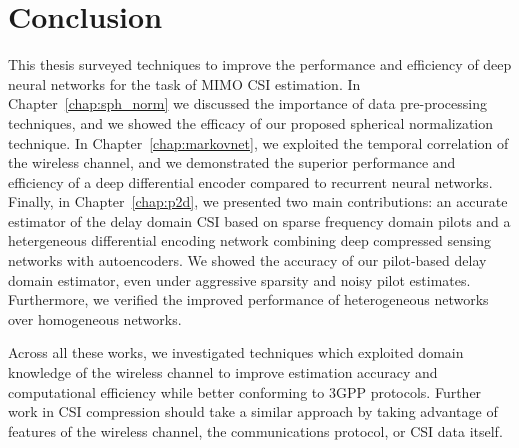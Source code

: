 \chapter{Conclusion} \label{chap:conclusion}

This thesis surveyed techniques to improve the performance and efficiency of deep neural networks for the task of MIMO CSI estimation. In Chapter~\ref{chap:sph_norm} we discussed the importance of data pre-processing techniques, and we showed the efficacy of our proposed spherical normalization technique. In Chapter~\ref{chap:markovnet}, we exploited the temporal correlation of the wireless channel, and we demonstrated the superior performance and efficiency of a deep differential encoder compared to recurrent neural networks. Finally, in Chapter~\ref{chap:p2d}, we presented two main contributions: an accurate estimator of the delay domain CSI based on sparse frequency domain pilots and a hetergeneous differential encoding network combining deep compressed sensing networks with autoencoders. We showed the accuracy of our pilot-based delay domain estimator, even under aggressive sparsity and noisy pilot estimates. Furthermore, we verified the improved performance of heterogeneous networks over homogeneous networks.

Across all these works, we investigated techniques which exploited domain knowledge of the wireless channel to improve estimation accuracy and computational efficiency while better conforming to 3GPP protocols. Further work in CSI compression should take a similar approach by taking advantage of features of the wireless channel, the communications protocol, or CSI data itself.